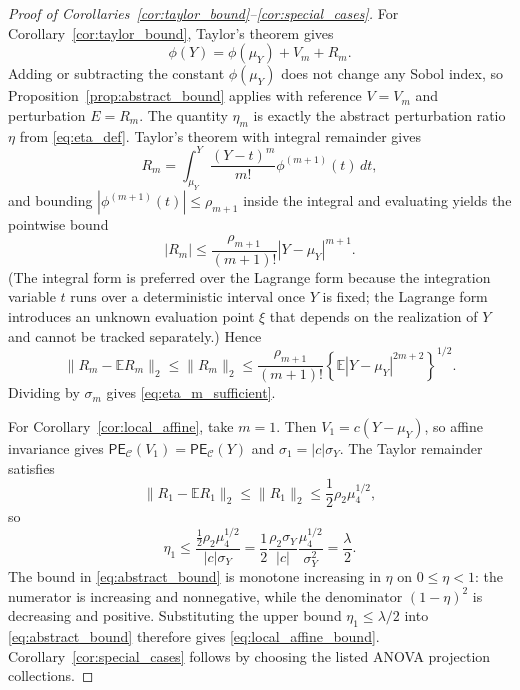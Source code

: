 \documentclass[11pt,letterpaper]{article}
\newcommand{\E}{\mathbb{E}}
\theoremstyle{remark}
\begin{document}
\begin{proof}[Proof of Corollaries~\ref{cor:taylor_bound}--\ref{cor:special_cases}]
For Corollary~\ref{cor:taylor_bound}, Taylor's theorem gives
\begin{equation}
  \phi(Y)=\phi(\mu_Y)+V_m+R_m.
\end{equation}
Adding or subtracting the constant $\phi(\mu_Y)$ does not change any Sobol
index, so Proposition~\ref{prop:abstract_bound} applies with reference $V=V_m$
and perturbation $E=R_m$. The quantity $\eta_m$ is exactly the abstract
perturbation ratio $\eta$ from \eqref{eq:eta_def}. Taylor's theorem with
integral remainder gives
\begin{equation}
  R_m
  =\int_{\mu_Y}^{Y}\frac{(Y-t)^m}{m!}\phi^{(m+1)}(t)\,dt,
\end{equation}
and bounding $|\phi^{(m+1)}(t)|\leq\rho_{m+1}$ inside the integral and
evaluating yields the pointwise bound
\begin{equation}
  |R_m|
  \leq
  \frac{\rho_{m+1}}{(m+1)!}|Y-\mu_Y|^{m+1}.
  \label{eq:Rm_pointwise}
\end{equation}
(The integral form is preferred over the Lagrange form because the integration
variable $t$ runs over a deterministic interval once $Y$ is fixed; the Lagrange
form introduces an unknown evaluation point $\xi$ that depends on the
realization of $Y$ and cannot be tracked separately.) Hence
\begin{equation}
  \|R_m-\E R_m\|_2
  \leq \|R_m\|_2
  \leq
  \frac{\rho_{m+1}}{(m+1)!}
  \left\{\E|Y-\mu_Y|^{2m+2}\right\}^{1/2}.
\end{equation}
Dividing by $\sigma_m$ gives \eqref{eq:eta_m_sufficient}.

For Corollary~\ref{cor:local_affine}, take $m=1$. Then
$V_1=c(Y-\mu_Y)$, so affine invariance gives
$\mathsf{PE}_{\mathscr C}(V_1)=\mathsf{PE}_{\mathscr C}(Y)$ and
$\sigma_1=|c|\sigma_Y$. The Taylor remainder satisfies
\begin{equation}
  \|R_1-\E R_1\|_2
  \leq \|R_1\|_2
  \leq \frac12\rho_2\mu_4^{1/2},
\end{equation}
so
\begin{equation}
  \eta_1
  \leq
  \frac{\frac12\rho_2\mu_4^{1/2}}{|c|\sigma_Y}
  =\frac12\frac{\rho_2\sigma_Y}{|c|}\frac{\mu_4^{1/2}}{\sigma_Y^2}
  =\frac{\lambda}{2}.
\end{equation}
The bound in \eqref{eq:abstract_bound} is monotone increasing in $\eta$ on
$0\leq\eta<1$: the numerator is increasing and nonnegative, while the
denominator $(1-\eta)^2$ is decreasing and positive. Substituting the upper
bound $\eta_1\leq\lambda/2$ into \eqref{eq:abstract_bound} therefore gives
\eqref{eq:local_affine_bound}. Corollary~\ref{cor:special_cases} follows by
choosing the listed ANOVA projection collections.
\end{proof}
\end{document}
